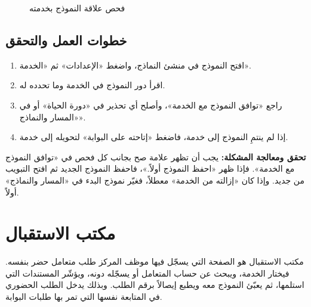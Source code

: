 \begin{figure}[H]
\centering
{}
\rclegend
\caption{فحص علاقة النموذج بخدمته}
\label{fig:builder-services-form-settings-flow}
\end{figure}

\subsection{خطوات العمل والتحقق}
\begin{enumerate}
\item افتح النموذج في منشئ النماذج، واضغط «الإعدادات» ثم «الخدمة».
\item اقرأ دور النموذج في الخدمة وما تحدده له.
\item راجع «توافق النموذج مع الخدمة»، وأصلح أي تحذير في «دورة الحياة» أو في «المسار والنماذج».
\item إذا لم ينتمِ النموذج إلى خدمة، فاضغط «إتاحته على البوابة» لتحويله إلى خدمة.
\end{enumerate}

\textbf{تحقق ومعالجة المشكلة:} يجب أن تظهر علامة صح بجانب كل فحص في «توافق النموذج مع الخدمة». فإذا ظهر «احفظ النموذج أولاً.»، فاحفظ النموذج الجديد ثم افتح التبويب من جديد. وإذا كان «إزالته من الخدمة» معطلاً، فغيّر نموذج البدء في «المسار والنماذج» أولاً.

\clearpage
\section{مكتب الاستقبال}
\label{sec:builder-feature-services-intake}

مكتب الاستقبال هو الصفحة التي يسجّل فيها موظف المركز طلب متعامل حضر بنفسه. فيختار الخدمة، ويبحث عن حساب المتعامل أو يسجّله دونه، ويؤشّر المستندات التي استلمها، ثم يعبّئ النموذج معه ويطبع إيصالاً برقم الطلب. وبذلك يدخل الطلب الحضوري في المتابعة نفسها التي تمر بها طلبات البوابة.

